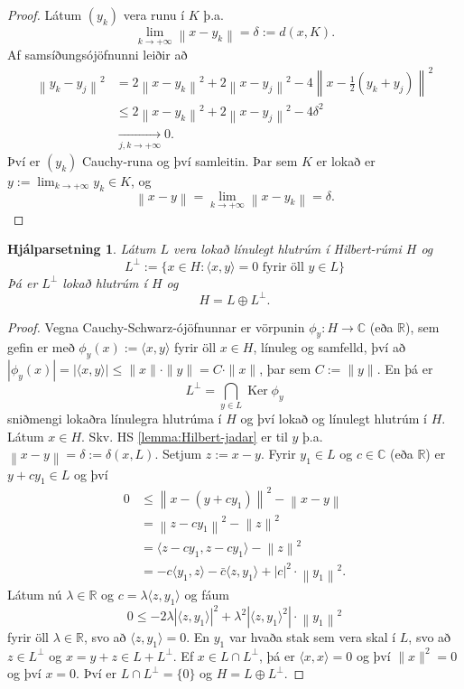 \documentclass[a4paper,icelandic,11pt]{book}
\theoremstyle{plain}      \newtheorem{setn}{Setning}[chapter]
\newtheorem{lemma}[setn]{Hjálparsetning}
\theoremstyle{definition} \newtheorem{skilgr}[setn]{Skilgreining}
\theoremstyle{remark}     \newtheorem*{ath}{Athugasemd}
\newcommand{\R}{\mathbb R}
\newcommand{\C}{\mathbb C}
\DeclareMathOperator{\Ker}{Ker}
\begin{document}
\begin{proof}
  Látum $(y_{k})$ vera runu í $K$ þ.a. 
  \[
  \lim_{k\to +\infty}\left\|
    x-y_{k}
  \right\|
  = \delta
  := d(x,K).
  \]
  Af samsíðungsójöfnunni leiðir að 
  \begin{align*}
    \left\|
      y_{k}-y_{j}
    \right\|^{2}
    &= 2 \left\|
      x - y_{k}
    \right\|^{2}
    + 2 \left\|
      x - y_{j}
    \right\|^{2}
    - 4 \left\|
      x - \frac 12 (y_{k} + y_{j})
    \right\|^{2}
    \\
    &\le 2 \left\|
      x - y_{k}
    \right\|^{2}
    + 2 \left\|
      x - y_{j}
    \right\|^{2}
    - 4 \delta^{2}
    \\
    &\xrightarrow[j,k\to+\infty]{} 0.
  \end{align*}
  Því er $(y_{k})$ Cauchy-runa og því samleitin. Þar sem $K$ er lokað
  er $y := \lim_{k\to+\infty}y_{k}\in K$, og
  \[
  \left\|
    x - y 
  \right\|
  = \lim_{k\to +\infty} \left\|
    x - y_{k}
  \right\|
  = \delta.
  \]
\end{proof}
\begin{lemma}
  Látum $L$ vera lokað línulegt hlutrúm í Hilbert-rúmi $H$ og 
  \[
  L^{\bot}
  := \{ x\in H : \langle x,y\rangle = 0 \text{ fyrir öll } y\in L \}
  \]
  Þá er $L^{\bot}$ lokað hlutrúm í $H$ og 
  \[
  H = L\oplus L^{\bot}.
  \]
\end{lemma}
\begin{proof}
  Vegna Cauchy-Schwarz-ójöfnunnar er vörpunin $\phi_{y}:H\to\C$ (eða
  $\R$), sem gefin er með $\phi_{y}(x):=\langle x,y\rangle$ fyrir öll
  $x\in H$, línuleg og samfelld, því að $|\phi_{y}(x)|=|\langle
  x,y\rangle| \le \| x\| \cdot \| y\| = C\cdot \| x\|$, þar sem $C :=
  \| y\|$. En þá er 
  \[
  L^{\bot}
  = \bigcap_{y\in L} \Ker\phi_{y}
  \]
  sniðmengi lokaðra línulegra hlutrúma í $H$ og því lokað og línulegt
  hlutrúm í $H$. Látum $x\in H$. Skv. HS \ref{lemma:Hilbert-jadar} er
  til $y$ þ.a. $\left\| x-y \right\| = \delta := \delta(x,L)$. Setjum
  $z := x-y$. Fyrir $y_{1}\in L$ og $c\in\C$ (eða $\R$) er
  $y+cy_{1}\in L$ og því
  \begin{align*}
    0
    &\le \left\|
      x - (y+cy_{1})
    \right\|^{2}
    - \left\|
      x - y
    \right\|
    \\
    &= \left\|
      z - cy_{1}
    \right\|^{2}
    - \left\|
      z
    \right\|^{2}
    \\
    &= \langle z - cy_{1}, z - cy_{1}\rangle
    - \left\|
      z
    \right\|^{2}
    \\
    &= -c \langle y_{1},z\rangle
    -\bar c \langle z,y_{1}\rangle
    +|c|^{2}\cdot \left\|
      y_{1}
    \right\|^{2}.
  \end{align*}
  Látum nú $\lambda\in\R$ og $c = \lambda\langle z,y_{1}\rangle$ og
  fáum 
  \[
  0 \le -2\lambda \left|
    \langle z, y_{1} \rangle
  \right|^{2}
  + \lambda^{2}\left|
    \langle z,y_{1}\rangle^{2}
  \right|
  \cdot \left\|
    y_{1}
  \right\|^{2}
  \]
  fyrir öll $\lambda\in\R$, svo að $\langle z,y_{1} \rangle = 0$. En
  $y_{1}$ var hvaða stak sem vera skal í $L$, svo að $z\in L^{\bot}$
  og $x = y + z\in L+L^{\bot}$. Ef $x\in L\cap L^{\bot}$, þá er
  $\langle x,x\rangle = 0$ og því $\|x\|^{2} = 0$ og því $x = 0$. Því
  er $L\cap L^{\bot} = \{ 0\}$ og $H = L\oplus L^{\bot}$.
\end{proof}
\end{document}
